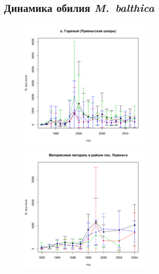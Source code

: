 \documentclass[12pt, a4paper]{article}
\begin{document}
\subsection{Динамика обилия {\it M.~balthica}}


\newpage
\begin{figure}[h]

\begin{minipage}[b]{.46\linewidth}
\begin{center}
\includegraphics[width=65mm]{../White_Sea/Luvenga_Goreliy/N2_dynamic.pdf}
\end{center}
\end{minipage}
%
\hfil %
%
\begin{minipage}[b]{.46\linewidth}
\begin{center}
\includegraphics[width=65mm]{../White_Sea//Luvenga_II_razrez/N2_dynamic.pdf}
\end{center}
\end{minipage}




\end{figure}
\end{document}
